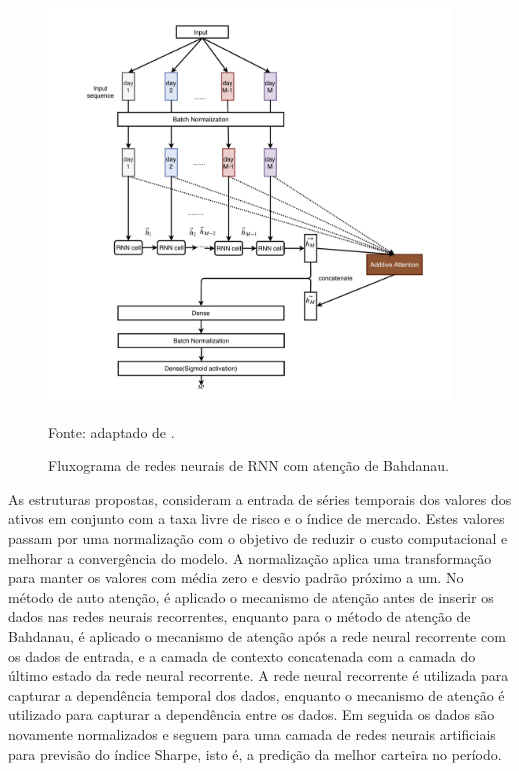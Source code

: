         \begin{figure}[htp]
            \centering
            \caption{Fluxograma de redes neurais de RNN com atenção de Bahdanau.}
            \label{fig:RNN_BauhAtt}
            \includegraphics[width=0.95\textwidth]{./imagens/RNN_AddAtt.png}
            \par \footnotesize Fonte: adaptado de .
        \end{figure}

        \ipar As estruturas propostas, consideram a entrada de séries temporais dos valores dos ativos em conjunto com a taxa livre de risco e o índice de mercado. Estes valores passam por uma normalização com o objetivo de reduzir o custo computacional e melhorar a convergência do modelo. A normalização aplica uma transformação para manter os valores com média zero e desvio padrão próximo a um. No método de auto atenção, é aplicado o mecanismo de atenção antes de inserir os dados nas redes neurais recorrentes, enquanto para o método de atenção de Bahdanau, é aplicado o mecanismo de atenção após a rede neural recorrente com os dados de entrada, e a camada de contexto concatenada com a camada do último estado da rede neural recorrente. A rede neural recorrente é utilizada para capturar a dependência temporal dos dados, enquanto o mecanismo de atenção é utilizado para capturar a dependência entre os dados. Em seguida os dados são novamente normalizados e seguem para uma camada de redes neurais artificiais para previsão do índice Sharpe, isto é, a predição da melhor carteira no período. 
        
